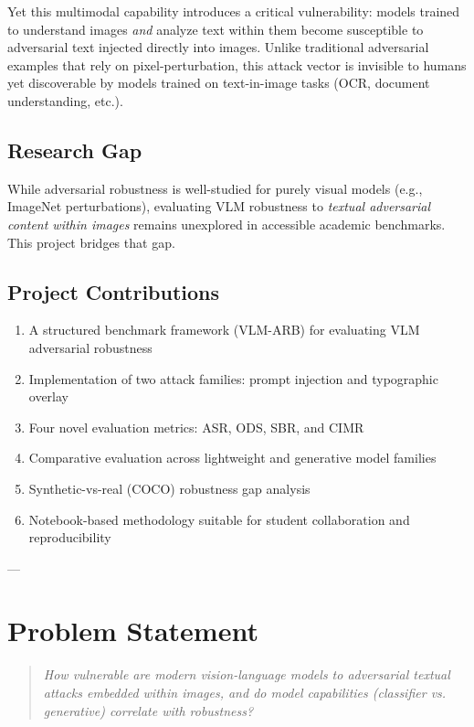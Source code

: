 \documentclass[11pt]{article}
\begin{document}
Yet this multimodal capability introduces a critical vulnerability: models trained to understand images \emph{and} analyze text within them become susceptible to adversarial text injected directly into images. Unlike traditional adversarial examples that rely on pixel-perturbation, this attack vector is invisible to humans yet discoverable by models trained on text-in-image tasks (OCR, document understanding, etc.).

\subsection{Research Gap}

While adversarial robustness is well-studied for purely visual models (e.g., ImageNet perturbations), evaluating VLM robustness to \emph{textual adversarial content within images} remains unexplored in accessible academic benchmarks. This project bridges that gap.

\subsection{Project Contributions}

\begin{enumerate}[leftmargin=2em]
    \item A structured benchmark framework (VLM-ARB) for evaluating VLM adversarial robustness
    \item Implementation of two attack families: prompt injection and typographic overlay
    \item Four novel evaluation metrics: ASR, ODS, SBR, and CIMR
    \item Comparative evaluation across lightweight and generative model families
    \item Synthetic-vs-real (COCO) robustness gap analysis
    \item Notebook-based methodology suitable for student collaboration and reproducibility
\end{enumerate}

---

\section{Problem Statement}

\begin{quote}
\centering
\large \textit{How vulnerable are modern vision-language models to adversarial textual attacks embedded within images, and do model capabilities (classifier vs. generative) correlate with robustness?}
\end{quote}
\end{document}
